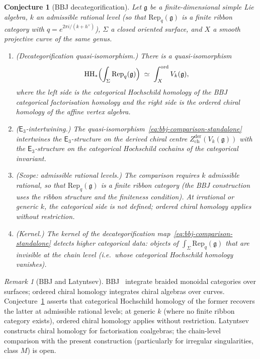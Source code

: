 \documentclass[11pt,reqno]{amsart}
\newtheorem{conjecture}[theorem]{Conjecture}
\theoremstyle{definition}
\theoremstyle{remark}
\newtheorem{remark}[theorem]{Remark}
\newcommand{\HH}{\mathrm{HH}}
\providecommand{\Ethree}{\mathsf{E}_{3}}
\newcommand{\fg}{\mathfrak{g}}
\numberwithin{equation}{section}
\begin{document}
\begin{conjecture}[BBJ decategorification]
\label{conj:bbj-decategorification}
Let $\fg$ be a finite-dimensional simple Lie algebra,
$k$ an admissible rational level (so that
$\mathrm{Rep}_q(\fg)$ is a finite ribbon category with
$q = e^{2\pi i/(k + h^\vee)}$), $\Sigma$ a closed oriented
surface, and $X$ a smooth projective curve of the same genus.
\begin{enumerate}
\item[\textup{(i)}]
  \textup{(Decategorification quasi-isomorphism.)}
  There is a quasi-isomorphism
  \begin{equation}\label{eq:bbj-comparison-standalone}
    \HH_*\Bigl(\int_\Sigma \mathrm{Rep}_q(\fg)\Bigr)
    \;\simeq\;
    \int_X^{\mathrm{ord}} V_k(\fg),
  \end{equation}
  where the left side is the categorical Hochschild homology of the
  BBJ categorical factorisation homology and the right
  side is the ordered chiral homology of the affine
  vertex algebra.
\item[\textup{(ii)}]
  \textup{($\Ethree$-intertwining.)}
  The quasi-isomorphism~\eqref{eq:bbj-comparison-standalone}
  intertwines the $\Ethree$-structure on the derived
  chiral centre
  $Z^{\mathrm{der}}_{\mathrm{ch}}(V_k(\fg))$ with the
  $\Ethree$-structure on the categorical Hochschild cochains of the
  categorical invariant.
\item[\textup{(iii)}]
  \textup{(Scope: admissible rational levels.)}
  The comparison requires $k$ admissible rational, so that
  $\mathrm{Rep}_q(\fg)$ is a finite ribbon category
  (the BBJ construction uses the ribbon structure and
  the finiteness condition). At irrational or generic $k$,
  the categorical side is not defined; ordered chiral
  homology applies without restriction.
\item[\textup{(iv)}]
  \textup{(Kernel.)}
  The kernel of the decategorification
  map~\eqref{eq:bbj-comparison-standalone} detects higher
  categorical data: objects of
  $\int_\Sigma \mathrm{Rep}_q(\fg)$ that are invisible
  at the chain level (i.e.\ whose categorical Hochschild homology
  vanishes).
\end{enumerate}
\end{conjecture}

\begin{remark}[BBJ and Latyntsev]
\label{rem:bbj}
\label{rem:latyntsev}
BBJ~\cite{BBJ15,BBJ16} integrate braided monoidal
categories over surfaces; ordered chiral homology integrates
chiral algebras over curves.
Conjecture~\ref{conj:bbj-decategorification} asserts that
categorical Hochschild homology of the former recovers the latter at
admissible rational levels; at generic $k$ (where no finite
ribbon category exists), ordered chiral homology applies
without restriction.
Latyntsev~\cite{Latyntsev23} constructs chiral homology for
factorisation coalgebras; the chain-level comparison with the
present construction (particularly for irregular
singularities, class $M$) is open.
\end{remark}
\end{document}
